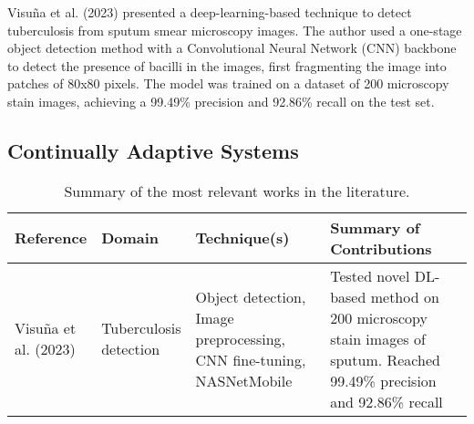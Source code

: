 \documentclass[../main.tex]{subfiles}
\begin{document}
    Visuña et al. (2023) \cite{visuna_novel_2023} presented a deep-learning-based technique to detect tuberculosis from sputum smear microscopy images. The author used a one-stage object detection method with a Convolutional Neural Network (CNN) backbone to detect the presence of bacilli in the images, first fragmenting the image into patches of 80x80 pixels. The model was trained on a dataset of 200 microscopy stain images, achieving a 99.49\% precision and 92.86\% recall on the test set. 
    
    \subsection{Continually Adaptive Systems} \label{sec:continually_adaptive_systems_sota} 

    
    \begin{table}[p]
        \caption{Summary of the most relevant works in the literature.}
        \label{tab:sota_summary}
        \hspace*{-1.5cm}
        \begin{tabular}{
            p{0.14\linewidth} | p{0.13\linewidth} | p{0.35\linewidth} | p{0.5\linewidth} 
        }
        \toprule
        \textbf{Reference} & \textbf{Domain} &\textbf{Technique(s)} & \textbf{Summary of Contributions} \\
        \midrule
        Visuña et al. (2023) \cite{visuna_novel_2023} & Tuberculosis detection & Object detection, Image preprocessing, CNN fine-tuning, NASNetMobile & Tested novel DL-based method on 200 microscopy stain images of sputum. Reached  99.49\% precision and 92.86\% recall \\
        \bottomrule
        \end{tabular}
    \end{table}

    
    
    
\end{document}
